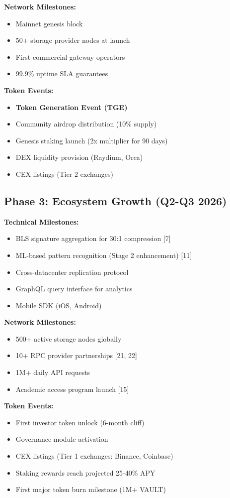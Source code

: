 \documentclass[12pt,a4paper]{article}
\begin{document}
\textbf{Network Milestones:}
\begin{itemize}
    \item Mainnet genesis block
    \item 50+ storage provider nodes at launch
    \item First commercial gateway operators
    \item 99.9\% uptime SLA guarantees
\end{itemize}

\textbf{Token Events:}
\begin{itemize}
    \item \textbf{Token Generation Event (TGE)}
    \item Community airdrop distribution (10\% supply)
    \item Genesis staking launch (2x multiplier for 90 days)
    \item DEX liquidity provision (Raydium, Orca)
    \item CEX listings (Tier 2 exchanges)
\end{itemize}

\subsection{Phase 3: Ecosystem Growth (Q2-Q3 2026)}

\textbf{Technical Milestones:}
\begin{itemize}
    \item BLS signature aggregation for 30:1 compression [7]
    \item ML-based pattern recognition (Stage 2 enhancement) [11]
    \item Cross-datacenter replication protocol
    \item GraphQL query interface for analytics
    \item Mobile SDK (iOS, Android)
\end{itemize}

\textbf{Network Milestones:}
\begin{itemize}
    \item 500+ active storage nodes globally
    \item 10+ RPC provider partnerships [21, 22]
    \item 1M+ daily API requests
    \item Academic access program launch [15]
\end{itemize}

\textbf{Token Events:}
\begin{itemize}
    \item First investor token unlock (6-month cliff)
    \item Governance module activation
    \item CEX listings (Tier 1 exchanges: Binance, Coinbase)
    \item Staking rewards reach projected 25-40\% APY
    \item First major token burn milestone (1M+ VAULT)
\end{itemize}
\end{document}
